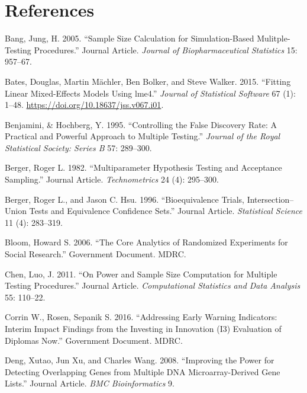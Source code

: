 \documentclass[
]{article}
\newlength{\cslhangindent}
\newlength{\cslentryspacingunit} %
\newenvironment{CSLReferences}[2] %
 {%
  \setlength{\parindent}{0pt}
  \ifodd #1
  \let\oldpar\par
  \def\par{\hangindent=\cslhangindent\oldpar}
  \fi
  \setlength{\parskip}{#2\cslentryspacingunit}
 }%
 {}
\begin{document}
\section{References}

\hypertarget{refs}{}
\begin{CSLReferences}{1}{0}
\leavevmode{}%
Bang, Jung, H. 2005. {``Sample Size Calculation for Simulation-Based
Mulitple-Testing Procedures.''} Journal Article. \emph{Journal of
Biopharmaceutical Statistics} 15: 957--67.

\leavevmode{}%
Bates, Douglas, Martin Mächler, Ben Bolker, and Steve Walker. 2015.
{``Fitting Linear Mixed-Effects Models Using {lme4}.''} \emph{Journal of
Statistical Software} 67 (1): 1--48.
\url{https://doi.org/10.18637/jss.v067.i01}.

\leavevmode{}%
Benjamini, \& Hochberg, Y. 1995. {``Controlling the False Discovery
Rate: A Practical and Powerful Approach to Multiple Testing.''}
\emph{Journal of the Royal Statistical Society: Series B} 57: 289--300.

\leavevmode{}%
Berger, Roger L. 1982. {``Multiparameter Hypothesis Testing and
Acceptance Sampling.''} Journal Article. \emph{Technometrics} 24 (4):
295--300.

\leavevmode{}%
Berger, Roger L., and Jason C. Hsu. 1996. {``Bioequivalence Trials,
Intersection--Union Tests and Equivalence Confidence Sets.''} Journal
Article. \emph{Statistical Science} 11 (4): 283--319.

\leavevmode{}%
Bloom, Howard S. 2006. {``The Core Analytics of Randomized Experiments
for Social Research.''} Government Document. MDRC.

\leavevmode{}%
Chen, Luo, J. 2011. {``On Power and Sample Size Computation for Multiple
Testing Procedures.''} Journal Article. \emph{Computational Statistics
and Data Analysis} 55: 110--22.

\leavevmode{}%
Corrin W., Rosen, Sepanik S. 2016. {``Addressing Early Warning
Indicators: Interim Impact Findings from the Investing in Innovation
(I3) Evaluation of Diplomas Now.''} Government Document. MDRC.

\leavevmode{}%
Deng, Xutao, Jun Xu, and Charles Wang. 2008. {``Improving the Power for
Detecting Overlapping Genes from Multiple DNA Microarray-Derived Gene
Lists.''} Journal Article. \emph{BMC Bioinformatics} 9.


\end{CSLReferences}
\end{document}
